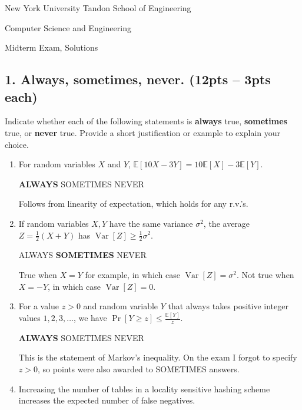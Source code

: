 \documentclass[10pt]{article}
\newcommand{\E}{\mathbb{E}}
\DeclareMathOperator{\Var}{Var}
\begin{document}
	
\begin{center}
	\normalsize
	New York University Tandon School of Engineering
	
	Computer Science and Engineering
	\medskip
	
	\large
	Midterm Exam, Solutions
	\medskip
\end{center}


\subsection{1. Always, sometimes, never. (\textbf{\small 12pts -- 3pts each})} 
Indicate whether each of the following statements is \textbf{always} true, \textbf{sometimes} true, or \textbf{never} true. Provide a short justification or example to explain your choice. 
\begin{enumerate}[label=(\alph*)]
	
	\item For random variables $X$ and $Y$, $\E[10X - 3Y] = 10\E[X] - 3\E[Y]$.
	
	\textbf{ALWAYS}\hspace{1em} SOMETIMES\hspace{1em} NEVER
	
	Follows from linearity of expectation, which holds for any r.v.'s.
	
	\item If random variables $X,Y$ have the same variance $\sigma^2$, the average $Z=\frac{1}{2}(X+Y)$ has $\Var[Z]\geq\frac{1}{2}\sigma^2$. 
	
	ALWAYS\hspace{1em} \textbf{SOMETIMES}\hspace{1em} NEVER
	
	True when $X = Y$ for example, in which case $\Var[Z] = \sigma^2$. Not true when $X = -Y$, in which case $\Var[Z] = 0$.
	
	\item For a value $z > 0$ and random variable $Y$ that always takes positive integer values $1, 2, 3, \ldots$, we have  $\Pr[Y \geq z] \leq \frac{\E[Y]}{z}$. 
	
	\textbf{ALWAYS}\hspace{1em} SOMETIMES\hspace{1em} NEVER
	
	This is the statement of Markov's inequality. On the exam I forgot to specify $z > 0$, so points were also awarded to SOMETIMES answers.
	
	\item Increasing the number of tables in a locality sensitive hashing scheme increases the expected number of false negatives.
	

\end{enumerate}
\end{document}
